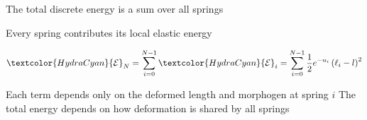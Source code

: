\begin{frame}{The total discrete energy is a sum over all springs}

  \vspace{0.10cm}

  \begin{center}
    \begin{minipage}{0.82\linewidth}
      {\color{HydraMuted}\fontsize{8}{9.8}\selectfont
        Every spring contributes its local elastic energy
      \par}
      \vspace{-0.10cm}
      {\color{HydraWhite}\bfseries\fontsize{14.2}{17.8}\selectfont
      \begin{align*}
        \textcolor{HydraCyan}{\mathcal E}_N
        =
        \sum_{i=0}^{N-1}\textcolor{HydraCyan}{\mathcal E}_i=
        \sum_{i=0}^{N-1}
        \frac12e^{-u_i}\left(\ell_i-l\right)^2
      \end{align*}
      }
      \par
      \vspace{-0.28cm}
        {Each term depends only on the deformed length and morphogen at spring $i$}
      \vspace{-0.10cm}
        {The total energy depends on how deformation is shared by all springs}
    \end{minipage}
  \end{center}

\end{frame}





